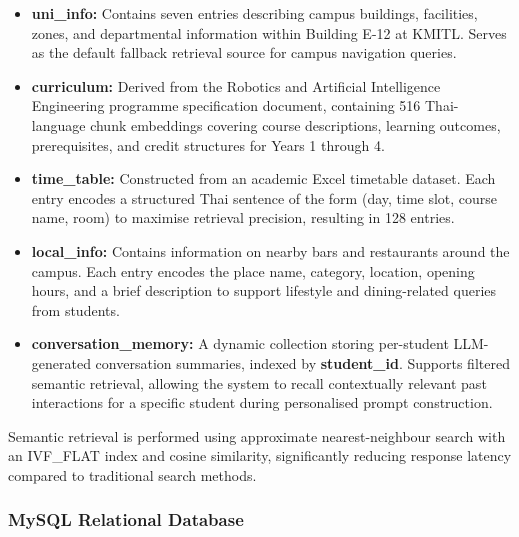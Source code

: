 \begin{itemize}
    \item \textbf{uni\_info:} Contains seven entries describing campus buildings, facilities, zones, and departmental information within Building E-12 at KMITL. Serves as the default fallback retrieval source for campus navigation queries.

    \item \textbf{curriculum:} Derived from the Robotics and Artificial Intelligence Engineering programme specification document, containing 516 Thai-language chunk embeddings covering course descriptions, learning outcomes, prerequisites, and credit structures for Years 1 through 4.

    \item \textbf{time\_table:} Constructed from an academic Excel timetable dataset. Each entry encodes a structured Thai sentence of the form (day, time slot, course name, room) to maximise retrieval precision, resulting in 128 entries.
    
    \item \textbf{local\_info:} Contains information on nearby bars and restaurants around the campus. Each entry encodes the place name, category, location, opening hours, and a brief description to support lifestyle and dining-related queries from students.
    
    
    \item \textbf{conversation\_memory:} A dynamic collection storing per-student LLM-generated conversation summaries, indexed by \textbf{student\_id}. Supports filtered semantic retrieval, allowing the system to recall contextually relevant past interactions for a specific student during personalised prompt construction.
\end{itemize}

Semantic retrieval is performed using approximate nearest-neighbour search with an IVF\_FLAT index and cosine similarity, significantly reducing response latency compared to traditional search methods.

\subsubsection{MySQL Relational Database}

